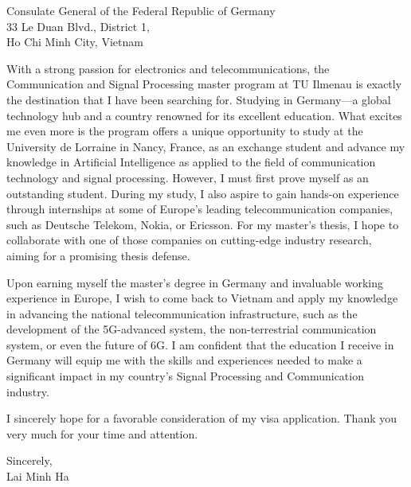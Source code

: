 \documentclass[a4paper,11pt]{letter}
\begin{document}
\begin{letter}{
    Consulate General of the Federal Republic of Germany
    \\ 33 Le Duan Blvd., District 1,
    \\ Ho Chi Minh City, Vietnam
}

With a strong passion for electronics and telecommunications, the Communication and Signal Processing master program at TU Ilmenau is exactly the destination that I have been searching for. Studying in Germany—a global technology hub and a country renowned for its excellent education. What excites me even more is the program offers a unique opportunity to study at the University de Lorraine in Nancy, France, as an exchange student and advance my knowledge in Artificial Intelligence as applied to the field of communication technology and signal processing. However, I must first prove myself as an outstanding student. During my study, I also aspire to gain hands-on experience through internships at some of Europe's leading telecommunication companies, such as Deutsche Telekom, Nokia, or Ericsson. For my master's thesis, I hope to collaborate with one of those companies on cutting-edge industry research, aiming for a promising thesis defense.

Upon earning myself the master's degree in Germany and invaluable working experience in Europe, I wish to come back to Vietnam and apply my knowledge in advancing the national telecommunication infrastructure, such as the development of the 5G-advanced system, the non-terrestrial communication system, or even the future of 6G. I am confident that the education I receive in Germany will equip me with the skills and experiences needed to make a significant impact in my country's Signal Processing and Communication industry.

I sincerely hope for a favorable consideration of my visa application. Thank you very much for your time and attention.

\begin{flushright}
    Sincerely,
    \vspace{1.15cm}
    \\Lai Minh Ha
\end{flushright}

\end{letter}
\end{document}
